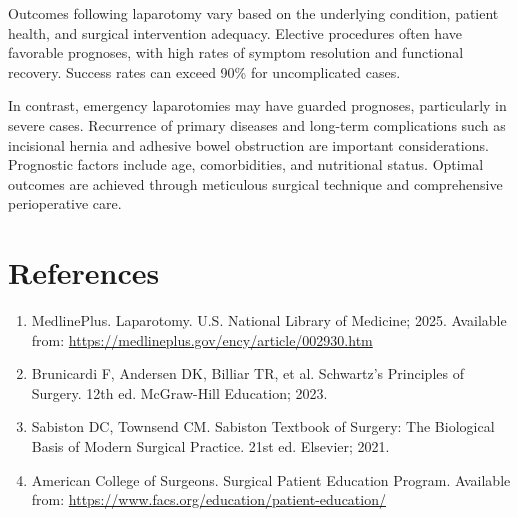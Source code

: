 Outcomes following laparotomy vary based on the underlying condition, patient health, and surgical intervention adequacy. Elective procedures often have favorable prognoses, with high rates of symptom resolution and functional recovery. Success rates can exceed 90\% for uncomplicated cases.

In contrast, emergency laparotomies may have guarded prognoses, particularly in severe cases. Recurrence of primary diseases and long-term complications such as incisional hernia and adhesive bowel obstruction are important considerations. Prognostic factors include age, comorbidities, and nutritional status. Optimal outcomes are achieved through meticulous surgical technique and comprehensive perioperative care.

\section*{References}
\begin{enumerate}
  \item MedlinePlus. Laparotomy. U.S. National Library of Medicine; 2025. Available from: \url{https://medlineplus.gov/ency/article/002930.htm}
  
  \item Brunicardi F, Andersen DK, Billiar TR, et al. Schwartz's Principles of Surgery. 12th ed. McGraw-Hill Education; 2023.
  
  \item Sabiston DC, Townsend CM. Sabiston Textbook of Surgery: The Biological Basis of Modern Surgical Practice. 21st ed. Elsevier; 2021.
  
  \item American College of Surgeons. Surgical Patient Education Program. Available from: \url{https://www.facs.org/education/patient-education/}
\end{enumerate}

\clearpage

